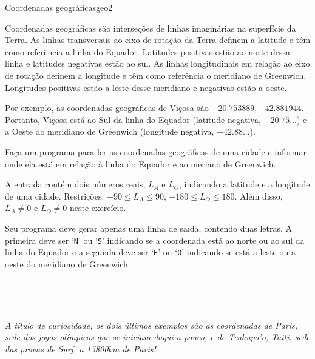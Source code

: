 \documentclass[12pt,a4paper,oneside]{article}
\begin{document}
\begin{problem}{Coordenadas geográficas}{geo}{2}

Coordenadas geográficas são interseções de linhas imaginárias na superfície da Terra. As linhas transversais ao eixo de rotação da Terra definem a latitude e têm como referência a linha do Equador. Latitudes positivas estão ao norte dessa linha e latitudes negativas estão ao sul. As linhas longitudinais em relação ao eixo de rotação definem a longitude e têm como referência o meridiano de Greenwich. Longitudes positivas estão a leste desse meridiano e negativas estão a oeste.

Por exemplo, as coordenadas geográficas de Viçosa são $-20.753889, -42.881944$. Portanto, Viçosa está ao Sul da linha do Equador (latitude negativa, $-20.75$...) e a Oeste do meridiano de Greenwich (longitude negativa, $-42.88$...).

Faça um programa para ler as coordenadas geográficas de uma cidade e informar onde ela está em relação à linha do Equador e ao meriano de Greenwich.

%

\InputFile

A entrada contém dois números reais, $L_A$ e $L_O$, indicando a latitude e a longitude de uma cidade. Restrições: $-90 \leq L_A \leq 90$, $-180 \leq L_O \leq 180$. Além disso, $L_A \neq 0$ e $L_O \neq 0$ neste exercício.


\OutputFile

Seu programa deve gerar apenas uma linha de saída, contendo duas letras. A primeira deve ser `\texttt{N}' ou `\texttt{S}' indicando se a coordenada está ao norte ou ao sul da linha do Equador e a segunda deve ser `\texttt{E}' ou `\texttt{O}' indicando se está a leste ou a oeste do meridiano de Greenwich.


\Example

\begin{example}
%
\end{example}\\

\begin{example}
%
\end{example}\\

\begin{example}
%
\end{example}

\textit{\small A título de curiosidade, os dois últimos exemplos são as coordenadas de Paris, sede dos jogos olímpicos que se iniciam daqui a pouco, e de Teahupo'o, Taiti, sede das provas de Surf, a 15800km de Paris!}


\end{problem}
\end{document}
